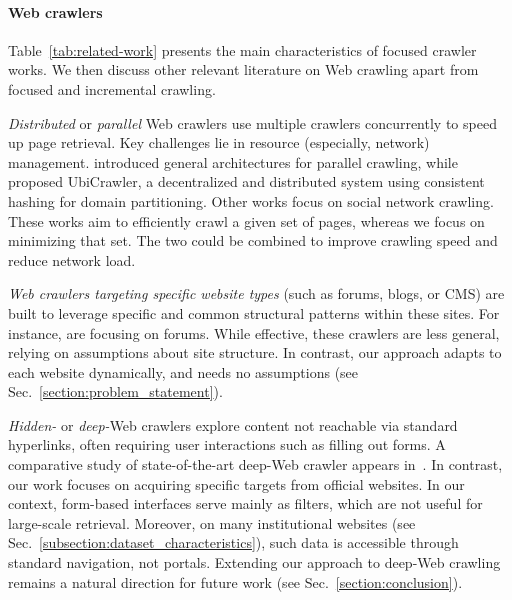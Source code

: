 \begin{asparaenum}
\begin{toappendix}
    \paragraph*{Web crawlers}
    Table~\ref{tab:related-work} presents the main characteristics of focused crawler works. We then discuss other relevant literature on Web crawling apart from focused and incremental crawling.
    \begin{asparaenum}
	\item \emph{Distributed} or \emph{parallel} Web crawlers use multiple
	crawlers concurrently to speed up page retrieval. Key challenges lie in resource (especially, network)
	management. \cite{cho2002parallel} introduced general architectures
	for parallel crawling, while \cite{boldi2004ubicrawler} proposed
	\textsf{\small UbiCrawler}, a decentralized and distributed system using consistent hashing for domain partitioning. Other works \cite{chau2007parallel, bosnjak2012twitterecho} focus on social network crawling. These  works aim to efficiently crawl a given set of pages, whereas we focus on minimizing that set. The two could be combined to improve crawling speed and reduce network load.
      \item \emph{Web crawlers targeting specific website types} (such as forums, blogs, or CMS) are built to leverage specific and common structural patterns within these sites. For instance, \cite{guo2006board, cai2008irobot} are focusing on forums. While effective, these crawlers are less general, relying on assumptions about site structure. In contrast, our approach adapts to each website dynamically, 
        and needs no assumptions (see Sec.~\ref{section:problem_statement}). 
	\item \emph{Hidden-} or \emph{deep-}Web crawlers explore content not reachable via standard hyperlinks, often requiring user interactions such as filling out forms. A comparative study of state-of-the-art deep-Web crawler appears in~\cite{hernandez2019deep}. In contrast, our work focuses on acquiring specific targets from official websites. In our context, form-based interfaces serve mainly as filters, which are not useful for large-scale retrieval. Moreover, on many institutional websites (see Sec.~\ref{subsection:dataset_characteristics}), such data is accessible through standard navigation, not portals. Extending our approach to deep-Web crawling remains a natural direction for future work (see Sec.~\ref{section:conclusion}).
  \end{asparaenum}
\end{toappendix}


\end{asparaenum}
